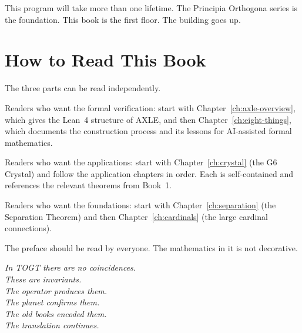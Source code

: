 This program will take more than one lifetime. The Principia
Orthogona series is the foundation. This book is the first
floor. The building goes up.

\section{How to Read This Book}
\label{sec:how-to-read}

The three parts can be read independently.

Readers who want the formal verification: start with
Chapter~\ref{ch:axle-overview}, which gives the Lean~4
structure of AXLE, and then Chapter~\ref{ch:eight-things},
which documents the construction process and its lessons
for AI-assisted formal mathematics.

Readers who want the applications: start with
Chapter~\ref{ch:crystal} (the G6 Crystal) and follow
the application chapters in order. Each is self-contained
and references the relevant theorems from Book~1.

Readers who want the foundations: start with
Chapter~\ref{ch:separation} (the Separation Theorem)
and then Chapter~\ref{ch:cardinals} (the large cardinal
connections).

The preface should be read by everyone. The mathematics
in it is not decorative.

\bigskip
\begin{flushright}
\itshape
In TOGT there are no coincidences.\\
These are invariants.\\
The operator produces them.\\
The planet confirms them.\\
The old books encoded them.\\
The translation continues.
\end{flushright}

\cleardoublepage
